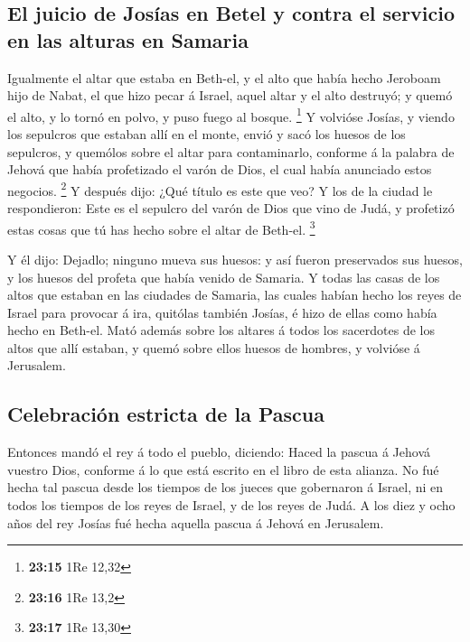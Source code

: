 \hypertarget{el-juicio-de-josuxedas-en-betel-y-contra-el-servicio-en-las-alturas-en-samaria}{%
\subsection{El juicio de Josías en Betel y contra el servicio en las
alturas en
Samaria}\label{el-juicio-de-josuxedas-en-betel-y-contra-el-servicio-en-las-alturas-en-samaria}}

 Igualmente el altar que estaba en Beth-el, y el alto que
había hecho Jeroboam hijo de Nabat, el que hizo pecar á Israel, aquel
altar y el alto destruyó; y quemó el alto, y lo tornó en polvo, y puso
fuego al bosque. \footnote{\textbf{23:15} 1Re 12,32}  Y
volvióse Josías, y viendo los sepulcros que estaban allí en el monte,
envió y sacó los huesos de los sepulcros, y quemólos sobre el altar para
contaminarlo, conforme á la palabra de Jehová que había profetizado el
varón de Dios, el cual había anunciado estos negocios. \footnote{\textbf{23:16}
  1Re 13,2}  Y después dijo: ¿Qué título es este que veo?
Y los de la ciudad le respondieron: Este es el sepulcro del varón de
Dios que vino de Judá, y profetizó estas cosas que tú has hecho sobre el
altar de Beth-el. \footnote{\textbf{23:17} 1Re 13,30}

 Y él dijo: Dejadlo; ninguno mueva sus huesos: y así
fueron preservados sus huesos, y los huesos del profeta que había venido
de Samaria.  Y todas las casas de los altos que estaban
en las ciudades de Samaria, las cuales habían hecho los reyes de Israel
para provocar á ira, quitólas también Josías, é hizo de ellas como había
hecho en Beth-el.  Mató además sobre los altares á todos
los sacerdotes de los altos que allí estaban, y quemó sobre ellos huesos
de hombres, y volvióse á Jerusalem.

\hypertarget{celebraciuxf3n-estricta-de-la-pascua}{%
\subsection{Celebración estricta de la
Pascua}\label{celebraciuxf3n-estricta-de-la-pascua}}

 Entonces mandó el rey á todo el pueblo, diciendo: Haced
la pascua á Jehová vuestro Dios, conforme á lo que está escrito en el
libro de esta alianza.  No fué hecha tal pascua desde los
tiempos de los jueces que gobernaron á Israel, ni en todos los tiempos
de los reyes de Israel, y de los reyes de Judá.  A los
diez y ocho años del rey Josías fué hecha aquella pascua á Jehová en
Jerusalem.

